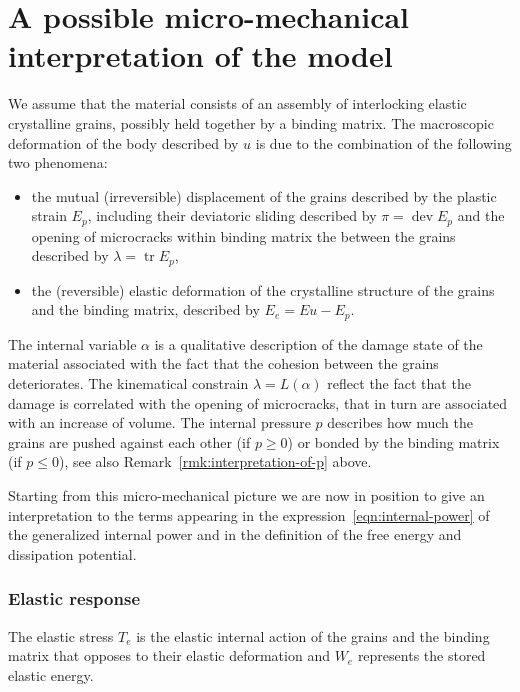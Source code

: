 \documentclass[a4paper,10pt,twoside]{amsbook}
\numberwithin{section}{chapter}
\numberwithin{equation}{chapter}
\theoremstyle{definition}
\DeclareMathOperator{\dev}{dev}
\DeclareMathOperator{\tr}{tr}
\begin{document}
\section{A possible micro-mechanical interpretation of the model}
\label{sec:micro-mechanical}

We assume that the material consists of an assembly of interlocking elastic crystalline grains, possibly held together by a binding matrix. The macroscopic deformation of the body described by $u$ is due to the combination of the following two phenomena:
\begin{itemize}
\item[(i)] the mutual (irreversible) displacement of the grains described by the plastic strain $E_p$, including their deviatoric sliding described by $\pi=\dev E_p$ and the opening of microcracks within binding matrix the between the grains described by $\lambda=\tr E_p$,
\item[(ii)] the (reversible) elastic deformation of the crystalline structure of the grains and the binding matrix, described by $E_e=Eu-E_p$.
\end{itemize}
The internal variable $\alpha$ is a qualitative description of the damage state of the material associated with the fact that the cohesion between the grains deteriorates. The kinematical constrain $\lambda=L(\alpha)$ reflect the fact that the damage is correlated with the opening of microcracks, that in turn are associated with an increase of volume. The internal pressure $p$ describes how much the grains are pushed against each other (if $p\ge0$) or bonded by the binding matrix (if $p\le0$), see also Remark~\ref{rmk:interpretation-of-p} above.

Starting from this micro-mechanical picture we are now in position to give an interpretation to the terms appearing in the expression~\eqref{eqn:internal-power} of the generalized internal power and in the definition of the free energy and dissipation potential.

\subsubsection*{Elastic response} The elastic stress $T_e$ is the elastic internal action of the grains and the binding matrix that opposes to their elastic deformation and $W_e$ represents the stored elastic energy.
\end{document}
